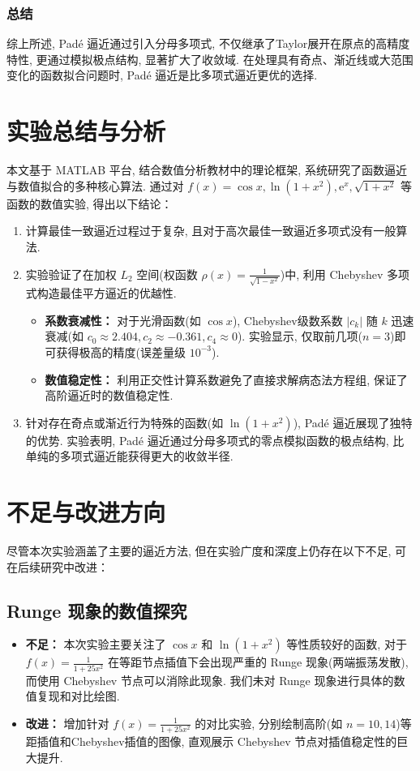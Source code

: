 \documentclass[UTF8, a4paper, 11pt]{ctexart}
\begin{document}
\subsubsection{总结}
综上所述, Padé 逼近通过引入分母多项式, 不仅继承了Taylor展开在原点的高精度特性, 更通过模拟极点结构, 显著扩大了收敛域. 在处理具有奇点、渐近线或大范围变化的函数拟合问题时, Padé 逼近是比多项式逼近更优的选择. 

\section{实验总结与分析}
本文基于 MATLAB 平台, 结合数值分析教材中的理论框架, 系统研究了函数逼近与数值拟合的多种核心算法. 通过对 $f(x) = \cos x, \ln(1+x^2), \mathrm{e}^x, \sqrt{1+x^2}$ 等函数的数值实验, 得出以下结论：
\begin{enumerate}
    \item 计算最佳一致逼近过程过于复杂, 且对于高次最佳一致逼近多项式没有一般算法. 
    \item 实验验证了在加权 $L_2$ 空间(权函数 $\rho(x) = \frac{1}{\sqrt{1-x^2}}$)中, 利用 Chebyshev 多项式构造最佳平方逼近的优越性. 
\begin{itemize}
    \item \textbf{系数衰减性：} 对于光滑函数(如 $\cos x$), Chebyshev级数系数 $|c_k|$ 随 $k$ 迅速衰减(如 $c_0 \approx 2.404, c_2 \approx -0.361, c_4 \approx 0$). 实验显示, 仅取前几项($n=3$)即可获得极高的精度(误差量级 $10^{-3}$). 
    \item \textbf{数值稳定性：} 利用正交性计算系数避免了直接求解病态法方程组, 保证了高阶逼近时的数值稳定性. 
\end{itemize}
    \item 针对存在奇点或渐近行为特殊的函数(如 $\ln(1+x^2)$), Padé 逼近展现了独特的优势. 实验表明, Padé 逼近通过分母多项式的零点模拟函数的极点结构, 比单纯的多项式逼近能获得更大的收敛半径. 
\end{enumerate}

\section{不足与改进方向}
尽管本次实验涵盖了主要的逼近方法, 但在实验广度和深度上仍存在以下不足, 可在后续研究中改进：
\subsection{Runge 现象的数值探究}
\begin{itemize}
    \item \textbf{不足：} 本次实验主要关注了 $\cos x$ 和 $\ln(1+x^2)$ 等性质较好的函数, 对于$f(x) = \frac{1}{1+25x^2}$ 在等距节点插值下会出现严重的 Runge 现象(两端振荡发散), 而使用 Chebyshev 节点可以消除此现象. 我们未对 Runge 现象进行具体的数值复现和对比绘图. 
    \item \textbf{改进：} 增加针对 $f(x) = \frac{1}{1+25x^2}$ 的对比实验, 分别绘制高阶(如 $n=10, 14$)等距插值和Chebyshev插值的图像, 直观展示 Chebyshev 节点对插值稳定性的巨大提升. 
\end{itemize}
\end{document}
